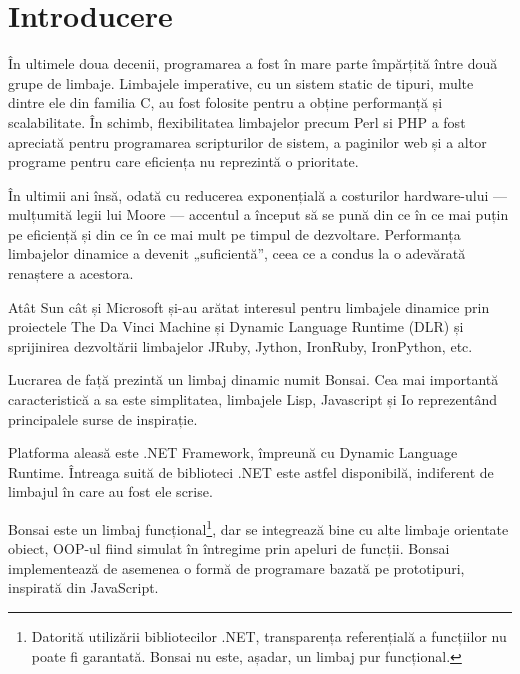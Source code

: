 \documentclass[12pt,a4paper]{memoir}
\begin{document}
\setcounter{page}{1}
\tableofcontents


\chapter{Introducere}

În ultimele doua decenii, programarea a fost în mare parte împărțită între două grupe de limbaje. Limbajele imperative, cu un sistem static de tipuri, multe dintre ele din familia C, au fost folosite pentru a obține performanță și scalabilitate. În schimb, flexibilitatea limbajelor precum Perl si PHP a fost apreciată pentru programarea scripturilor de sistem, a paginilor web și a altor programe pentru care eficiența nu reprezintă o prioritate.

În ultimii ani însă, odată cu reducerea exponențială a costurilor hardware-ului — mulțumită legii lui Moore — accentul a început să se pună din ce în ce mai puțin pe eficiență și din ce în ce mai mult pe timpul de dezvoltare. Performanța limbajelor dinamice a devenit „suficientă”, ceea ce a condus la o adevărată renaștere a acestora.

Atât Sun cât și Microsoft și-au arătat interesul pentru limbajele dinamice prin proiectele The Da Vinci Machine\cite{daVinciMachine} și Dynamic Language Runtime (DLR)\cite{dlr} și sprijinirea dezvoltării limbajelor JRuby\cite{jruby}, Jython\cite{jython}, IronRuby\cite{ironruby}, IronPython\cite{ironpython}, etc.

Lucrarea de față prezintă un limbaj dinamic numit Bonsai. Cea mai importantă caracteristică a sa este simplitatea, limbajele Lisp, Javascript și Io\cite{io} reprezentând principalele surse de inspirație.

Platforma aleasă este .NET Framework, împreună cu Dynamic Language Runtime. Întreaga suită de biblioteci .NET este astfel disponibilă, indiferent de limbajul în care au fost ele scrise. 

Bonsai este un limbaj funcțional\footnote{Datorită utilizării bibliotecilor .NET, transparența referențială a funcțiilor nu poate fi garantată. Bonsai nu este, așadar, un limbaj pur funcțional.}, dar se integrează bine cu alte limbaje orientate obiect, OOP-ul fiind simulat în întregime prin apeluri de funcții. Bonsai implementează de asemenea o formă de programare bazată pe prototipuri, inspirată din JavaScript.
\end{document}
